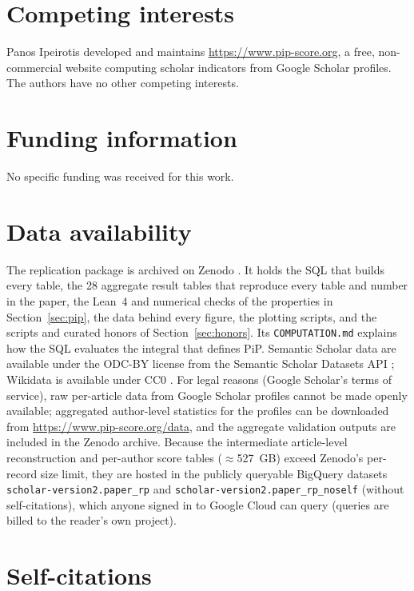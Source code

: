 \documentclass[11pt]{article}
\begin{document}
\section*{Competing interests}
Panos Ipeirotis developed and maintains \url{https://www.pip-score.org}, a free, non-commercial website computing
scholar indicators from Google Scholar profiles. The authors have no other competing interests.

\section*{Funding information}
No specific funding was received for this work.

\section*{Data availability}
The replication package is archived on Zenodo \citep{ipeirotis2026replication}. It holds the SQL that builds every
table, the 28 aggregate result tables that reproduce every table and number in the paper, the Lean~4 and numerical
checks of the properties in Section~\ref{sec:pip}, the data behind every figure, the plotting scripts, and the scripts
and curated honors of Section~\ref{sec:honors}. Its \texttt{COMPUTATION.md} explains how the SQL evaluates the integral
that defines PiP. Semantic Scholar data are available under the ODC-BY license from the Semantic Scholar Datasets API
\citep{s2datasets2026}; Wikidata is available under CC0 \citep{wikidata2026}. For legal reasons (Google Scholar's terms
of service), raw per-article data from Google Scholar profiles cannot be made openly available; aggregated author-level
statistics for the profiles can be downloaded from \url{https://www.pip-score.org/data}, and the aggregate validation
outputs are included in the Zenodo archive. Because the intermediate article-level reconstruction and per-author score
tables ($\approx$527~GB) exceed Zenodo's per-record size limit, they are hosted in the publicly queryable BigQuery
datasets \texttt{scholar-version2.paper\_rp} and \texttt{scholar-version2.paper\_rp\_noself} (without self-citations),
which anyone signed in to Google Cloud can query (queries are billed to the reader's own project).




\appendix
\section{Self-citations}
\label{app:selfcites}
\end{document}
